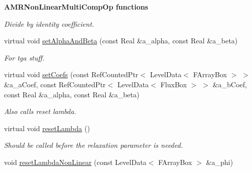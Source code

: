 \begin{Indent}{\bf A\-M\-R\-Non\-Linear\-Multi\-Comp\-Op functions}
\begin{DoxyCompactItemize}
\begin{DoxyCompactList}\small\item\em Divide by identity coefficient. \end{DoxyCompactList}\item 
\hypertarget{class_a_m_r_non_linear_multi_comp_op_a78c046aa738c5edede492bf14ef913de}{virtual void \hyperlink{class_a_m_r_non_linear_multi_comp_op_a78c046aa738c5edede492bf14ef913de}{set\-Alpha\-And\-Beta} (const Real \&a\-\_\-alpha, const Real \&a\-\_\-beta)}\label{class_a_m_r_non_linear_multi_comp_op_a78c046aa738c5edede492bf14ef913de}

\begin{DoxyCompactList}\small\item\em For tga stuff. \end{DoxyCompactList}\item 
\hypertarget{class_a_m_r_non_linear_multi_comp_op_a6029b152d2e8faddbf820f188cb73c01}{virtual void \hyperlink{class_a_m_r_non_linear_multi_comp_op_a6029b152d2e8faddbf820f188cb73c01}{set\-Coefs} (const Ref\-Counted\-Ptr$<$ Level\-Data$<$ F\-Array\-Box $>$ $>$ \&a\-\_\-a\-Coef, const Ref\-Counted\-Ptr$<$ Level\-Data$<$ Flux\-Box $>$ $>$ \&a\-\_\-b\-Coef, const Real \&a\-\_\-alpha, const Real \&a\-\_\-beta)}\label{class_a_m_r_non_linear_multi_comp_op_a6029b152d2e8faddbf820f188cb73c01}

\begin{DoxyCompactList}\small\item\em Also calls reset lambda. \end{DoxyCompactList}\item 
\hypertarget{class_a_m_r_non_linear_multi_comp_op_aa558902d2bd88e41dff404c6b3ae206f}{virtual void \hyperlink{class_a_m_r_non_linear_multi_comp_op_aa558902d2bd88e41dff404c6b3ae206f}{reset\-Lambda} ()}\label{class_a_m_r_non_linear_multi_comp_op_aa558902d2bd88e41dff404c6b3ae206f}

\begin{DoxyCompactList}\small\item\em Should be called before the relaxation parameter is needed. \end{DoxyCompactList}\item 
\hypertarget{class_a_m_r_non_linear_multi_comp_op_ad3c8e757a15bb3fdfa03c7b0c05315df}{void \hyperlink{class_a_m_r_non_linear_multi_comp_op_ad3c8e757a15bb3fdfa03c7b0c05315df}{reset\-Lambda\-Non\-Linear} (const Level\-Data$<$ F\-Array\-Box $>$ \&a\-\_\-phi)}\label{class_a_m_r_non_linear_multi_comp_op_ad3c8e757a15bb3fdfa03c7b0c05315df}


\end{DoxyCompactItemize}
\end{Indent}
